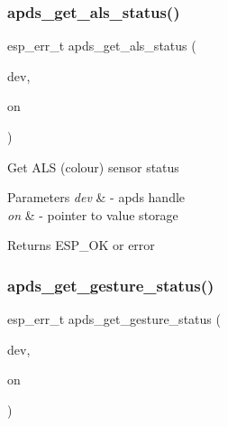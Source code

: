 \subsubsection{\texorpdfstring{apds\+\_\+get\+\_\+als\+\_\+status()}{apds\_get\_als\_status()}}
{\footnotesize\ttfamily esp\+\_\+err\+\_\+t apds\+\_\+get\+\_\+als\+\_\+status (\begin{DoxyParamCaption}\item[{\hyperlink{structAPDS9960__Driver}{A\+P\+D\+S\+\_\+\+D\+EV}}]{dev,  }\item[{\hyperlink{vl53l0x__types_8h_aba7bc1797add20fe3efdf37ced1182c5}{uint8\+\_\+t} $\ast$}]{on }\end{DoxyParamCaption})}




\begin{DoxyItemize}
\item Get A\+LS (colour) sensor status 
\end{DoxyItemize}


\begin{DoxyParams}{Parameters}
{\em dev} & -\/ apds handle \\
\hline
{\em on} & -\/ pointer to value storage \\
\hline
\end{DoxyParams}
\begin{DoxyReturn}{Returns}
E\+S\+P\+\_\+\+OK or error 
\end{DoxyReturn}
\mbox{\label{group__APDS9960__SetStatusFunctions_ga4297b2f4e2b7dcb1f2bbc6c98833ecc2}} 
\subsubsection{\texorpdfstring{apds\+\_\+get\+\_\+gesture\+\_\+status()}{apds\_get\_gesture\_status()}}
{\footnotesize\ttfamily esp\+\_\+err\+\_\+t apds\+\_\+get\+\_\+gesture\+\_\+status (\begin{DoxyParamCaption}\item[{\hyperlink{structAPDS9960__Driver}{A\+P\+D\+S\+\_\+\+D\+EV}}]{dev,  }\item[{\hyperlink{vl53l0x__types_8h_aba7bc1797add20fe3efdf37ced1182c5}{uint8\+\_\+t} $\ast$}]{on }\end{DoxyParamCaption})}




